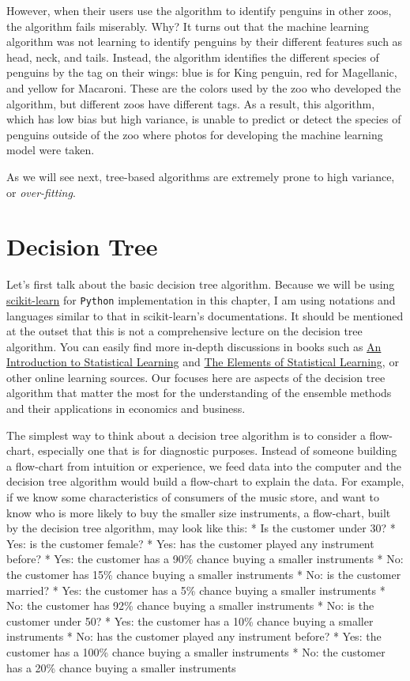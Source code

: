 \documentclass[
]{book}
\theoremstyle{definition}
\theoremstyle{definition}
\theoremstyle{definition}
\theoremstyle{definition}
\theoremstyle{remark}
\begin{document}
However, when their users use the algorithm to identify penguins in other zoos, the algorithm fails miserably. Why? It turns out that the machine learning algorithm was not learning to identify penguins by their different features such as head, neck, and tails. Instead, the algorithm identifies the different species of penguins by the tag on their wings: blue is for King penguin, red for Magellanic, and yellow for Macaroni. These are the colors used by the zoo who developed the algorithm, but different zoos have different tags. As a result, this algorithm, which has low bias but high variance, is unable to predict or detect the species of penguins outside of the zoo where photos for developing the machine learning model were taken.

As we will see next, tree-based algorithms are extremely prone to high variance, or \emph{over-fitting}.

\hypertarget{decision-tree}{%
\section{Decision Tree}\label{decision-tree}}

Let's first talk about the basic decision tree algorithm. Because we will be using \href{https://scikit-learn.org/stable/}{scikit-learn} for \texttt{Python} implementation in this chapter, I am using notations and languages similar to that in scikit-learn's documentations. It should be mentioned at the outset that this is not a comprehensive lecture on the decision tree algorithm. You can easily find more in-depth discussions in books such as \href{https://www.statlearning.com/}{An Introduction to Statistical Learning} and \href{https://hastie.su.domains/ElemStatLearn/}{The Elements of Statistical Learning}, or other online learning sources. Our focuses here are aspects of the decision tree algorithm that matter the most for the understanding of the ensemble methods and their applications in economics and business.

The simplest way to think about a decision tree algorithm is to consider a flow-chart, especially one that is for diagnostic purposes. Instead of someone building a flow-chart from intuition or experience, we feed data into the computer and the decision tree algorithm would build a flow-chart to explain the data. For example, if we know some characteristics of consumers of the music store, and want to know who is more likely to buy the smaller size instruments, a flow-chart, built by the decision tree algorithm, may look like this:
* Is the customer under 30?
* Yes: is the customer female?
* Yes: has the customer played any instrument before?
* Yes: the customer has a 90\% chance buying a smaller instruments
* No: the customer has 15\% chance buying a smaller instruments
* No: is the customer married?
* Yes: the customer has a 5\% chance buying a smaller instruments
* No: the customer has 92\% chance buying a smaller instruments
* No: is the customer under 50?
* Yes: the customer has a 10\% chance buying a smaller instruments
* No: has the customer played any instrument before?
* Yes: the customer has a 100\% chance buying a smaller instruments
* No: the customer has a 20\% chance buying a smaller instruments
\end{document}
